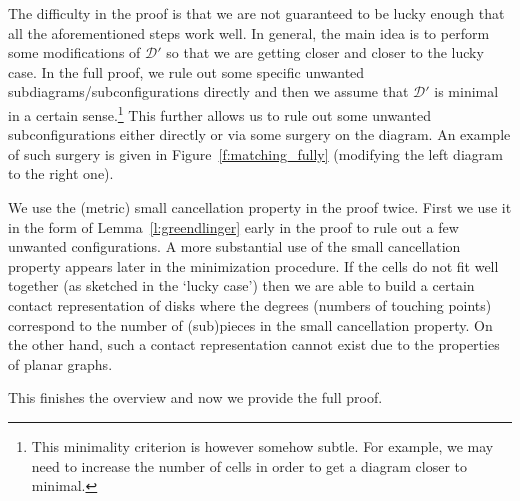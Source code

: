 \documentclass[10pt,a4paper]{article}
\theoremstyle{definition}
\theoremstyle{remark}
\newcommand\DD{\mathcal{D}}
\begin{document}
The difficulty in the proof is that we are not guaranteed to be lucky enough
that all the aforementioned steps work well. In general, the main idea is to
perform some modifications of $\DD'$ so that we are getting closer and closer
to the lucky case. In the full proof, we rule out some specific unwanted
subdiagrams/subconfigurations directly and then we assume that $\DD'$ is
minimal in a certain sense.\footnote{This minimality criterion is however somehow
subtle. For example, we may need to increase the number of cells in order to
get a diagram closer to minimal.} This further allows us to rule out some
unwanted subconfigurations either directly or via some surgery on the diagram.
An example of such surgery is given in Figure~\ref{f:matching_fully} (modifying
the left diagram to the right one). 

We use the (metric) small cancellation property in the proof twice. First we
use it in the form of Lemma~\ref{l:greendlinger} early in the proof to rule out a
few unwanted configurations. A more substantial use of the small cancellation
property appears later in the minimization procedure. If the cells do not fit
well together (as sketched in the `lucky case') then we are able to build a
certain contact representation of disks where the degrees (numbers of touching
points) correspond to the number of (sub)pieces in the small cancellation property.
On the other hand, such a contact representation cannot exist due to the
properties of planar graphs. 

This finishes the overview and now we provide the
full proof.
\end{document}

